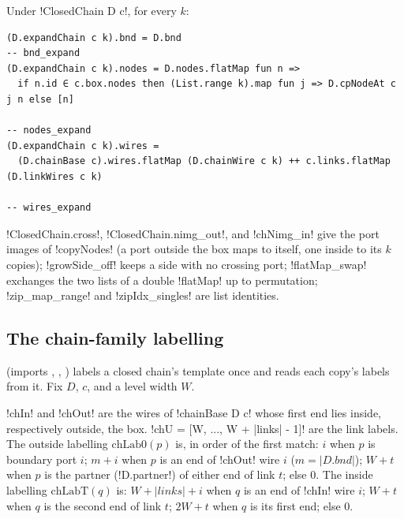 {\begin{proposition}\label{prop:boxes-expand-closed}
Under \lbx!ClosedChain D c!, for every $k$:
\begin{lstlisting}[style=leanbox]
(D.expandChain c k).bnd = D.bnd                                         -- bnd_expand
(D.expandChain c k).nodes = D.nodes.flatMap fun n =>
  if n.id ∈ c.box.nodes then (List.range k).map fun j => D.cpNodeAt c j n else [n]
                                                                        -- nodes_expand
(D.expandChain c k).wires =
  (D.chainBase c).wires.flatMap (D.chainWire c k) ++ c.links.flatMap (D.linkWires c k)
                                                                        -- wires_expand
\end{lstlisting}
\end{proposition}
\noindent \lbx!ClosedChain.cross!, \lbx!ClosedChain.nimg_out!, and \lbx!chNimg_in! give the port images of \lbx!copyNodes! (a port outside the box maps to itself, one inside to its $k$ copies); \lbx!growSide_off! keeps a side with no crossing port; \lbx!flatMap_swap! exchanges the two lists of a double \lbx!flatMap! up to permutation; \lbx!zip_map_range! and \lbx!zipIdx_singles! are list identities.

\subsection{The chain-family labelling}

 (imports , , ) labels a closed chain's template once and reads each copy's labels from it. Fix $D$, $c$, and a level width $W$.

\begin{definition}\label{def:boxes-chlab}
\lbx!chIn! and \lbx!chOut! are the wires of \lbx!chainBase D c! whose first end lies inside, respectively outside, the box. \lbx!chU = [W, ..., W + |links| - 1]! are the link labels. The outside labelling $\mathrm{chLab0}(p)$ is, in order of the first match: $i$ when $p$ is boundary port $i$; $m+i$ when $p$ is an end of \lbx!chOut! wire $i$ ($m=|D.\mathit{bnd}|$); $W+t$ when $p$ is the partner (\lbx!D.partner!) of either end of link $t$; else $0$. The inside labelling $\mathrm{chLabT}(q)$ is: $W+|\mathit{links}|+i$ when $q$ is an end of \lbx!chIn! wire $i$; $W+t$ when $q$ is the second end of link $t$; $2W+t$ when $q$ is its first end; else $0$.
\end{definition}

}

